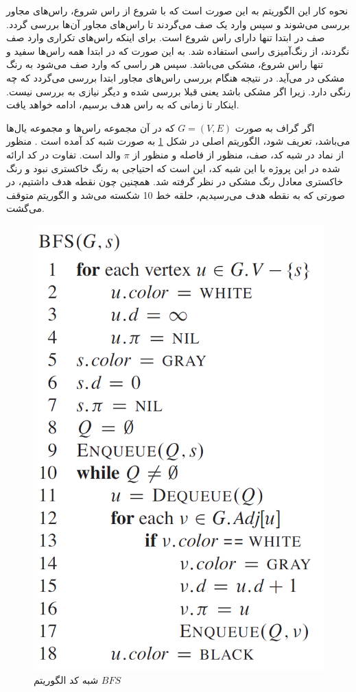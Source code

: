نحوه کار این الگوریتم به این صورت است که با شروع از راس شروع، راس‌های مجاور بررسی می‌شوند و سپس وارد یک صف می‌گردند تا راس‌های مجاور آن‌ها بررسی گردد. صف در ابتدا تنها دارای راس شروع است. برای اینکه راس‌های تکراری وارد صف نگردند، از رنگ‌آمیزی راسی استفاده شد. به این صورت که در ابتدا همه راس‌ها سفید و تنها راس شروع، مشکی می‌باشد. سپس هر راسی که وارد صف می‌شود به رنگ مشکی در می‌آید. در نتیجه هنگام بررسی راس‌های مجاور ابتدا بررسی می‌گردد که چه رنگی دارد. زیرا اگر مشکی باشد یعنی قبلا بررسی شده و دیگر نیازی به بررسی نیست. اینکار تا زمانی که به راس هدف برسیم، ادامه خواهد یافت.

اگر گراف به صورت 
$G = (V, E)$
که در آن  مجموعه راس‌ها و  مجموعه یال‌ها می‌باشد، تعریف شود، الگوریتم اصلی  در شکل \ref{Fig BFS Algorithm} به صورت شبه کد آمده است \cite{cormen2009introduction}. منظور از نماد  در شبه کد، صف، منظور از  فاصله و منظور از $\pi$ والد است. تفاوت در کد ارائه شده در این پروژه با این شبه کد، این است که احتیاجی به رنگ خاکستری نبود و رنگ خاکستری معادل رنگ مشکی در نظر گرفته شد. همچنین چون نقطه هدف داشتیم، در صورتی که به نقطه هدف می‌رسیدیم، حلقه خط 10 شکسته می‌شد و الگوریتم متوقف می‌گشت.
\begin{figure}[!h]
	\centering
	\includegraphics[scale=0.4]{Images/BFS-algorithm.png}
	\caption{شبه کد الگوریتم $BFS$}\label{Fig BFS Algorithm}
\end{figure}

